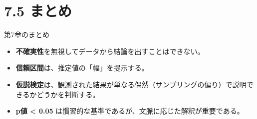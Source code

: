 \documentclass[
  ignorenonframetext,
]{beamer}
\providecommand{\tightlist}{%
  \setlength{\itemsep}{0pt}\setlength{\parskip}{0pt}}
\begin{document}
\hypertarget{ux307eux3068ux3081}{%
\section{7.5 まとめ}\label{ux307eux3068ux3081}}

\begin{frame}{第7章のまとめ}
\protect\hypertarget{ux7b2c7ux7ae0ux306eux307eux3068ux3081}{}
\begin{itemize}
\tightlist
\item
  \textbf{不確実性}を無視してデータから結論を出すことはできない。
\item
  \textbf{信頼区間}は、推定値の「幅」を提示する。
\item
  \textbf{仮説検定}は、観測された結果が単なる偶然（サンプリングの偏り）で説明できるかどうかを判断する。
\item
  \textbf{p値 \textless{} 0.05}
  は慣習的な基準であるが、文脈に応じた解釈が重要である。
\end{itemize}
\end{frame}
\end{document}
